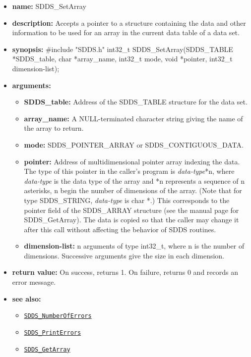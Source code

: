 \documentclass[11pt]{article}
\newcommand{\progref}[1]{\hyperref[SDDS_#1]{\tt SDDS\_#1}}
\begin{document}
\begin{itemize}
\item {\bf name:}\newline
SDDS\_SetArray
\item {\bf description:}\newline
Accepts a pointer to a structure containing the data and other information to be used for an array in the current data table of a data set.
\item {\bf synopsis:} \#include "SDDS.h"\newline
int32\_t SDDS\_SetArray(SDDS\_TABLE *SDDS\_table, char *array\_name, int32\_t mode, void *pointer, int32\_t dimension-list);
\item {\bf arguments:}
\begin{itemize}
\item {\bf SDDS\_table:} Address of the SDDS\_TABLE structure for the data set.
\item {\bf array\_name:} A NULL-terminated character string giving the name of the array to return.
\item {\bf mode:} SDDS\_POINTER\_ARRAY or SDDS\_CONTIGUOUS\_DATA.
\item {\bf pointer:} Address of multidimensional pointer array indexing the data. The type of this pointer in the caller's program is {\em data-type}*n, where {\em data-type} is the data type of the array and *n represents a sequence of n asterisks, n begin the number of dimensions of the array. (Note that for type SDDS\_STRING, {\em data-type} is char *.) This corresponds to the  pointer field of the SDDS\_ARRAY structure (see the manual page for SDDS\_GetArray). The data is copied so that the caller may change it after this call without affecting the behavior of SDDS routines.
\item {\bf dimension-list:} n arguments of type int32\_t, where n is the number of dimensions. Successive arguments give the size in each dimension.
\end{itemize}
\item {\bf return value:}\newline
On success, returns 1. On failure, returns 0 and records an error message.
\item {\bf see also:}
\begin{itemize}
\item \progref{NumberOfErrors}
\item \progref{PrintErrors}
\item \progref{GetArray}
\end{itemize}
\end{itemize}
\end{document}
